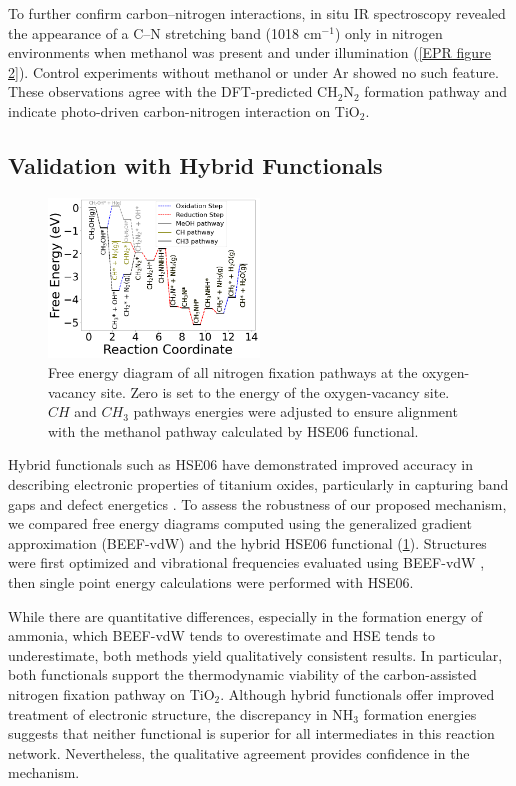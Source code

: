 To further confirm carbon–nitrogen interactions, in situ IR spectroscopy revealed the appearance of a C–N stretching band (1018 cm$^{-1}$) only in nitrogen environments when methanol was present and under illumination (\ref{EPR figure 2}). Control experiments without methanol or under Ar showed no such feature. These observations agree with the DFT-predicted CH$_2$N$_2$ formation pathway and indicate photo-driven carbon-nitrogen interaction on TiO$_2$.

\subsection{Validation with Hybrid Functionals}

\begin{figure}[h]
\centering
\includegraphics[width=0.5\textwidth]{figures/proposal_figures/HSE_full_fig.png}
\caption{Free energy diagram of all nitrogen fixation pathways at the oxygen-vacancy site. Zero is set to the energy of the oxygen-vacancy site. $CH$ and $CH_3$ pathways energies were adjusted to ensure alignment with the methanol pathway calculated by HSE06 functional.}
\label{fig:HSE_full_fig}
\end{figure}

Hybrid functionals such as HSE06 have demonstrated improved accuracy in describing electronic properties of titanium oxides, particularly in capturing band gaps and defect energetics \cite{hse}. To assess the robustness of our proposed mechanism, we compared free energy diagrams computed using the generalized gradient approximation (BEEF-vdW) and the hybrid HSE06 functional (\ref{fig:HSE_full_fig}). Structures were first optimized and vibrational frequencies evaluated using BEEF-vdW \cite{beef}, then single point energy calculations were performed with HSE06.

While there are quantitative differences, especially in the formation energy of ammonia, which BEEF-vdW tends to overestimate and HSE tends to underestimate, both methods yield qualitatively consistent results. In particular, both functionals support the thermodynamic viability of the carbon-assisted nitrogen fixation pathway on TiO$_2$. Although hybrid functionals offer improved treatment of electronic structure, the discrepancy in NH$_3$ formation energies suggests that neither functional is superior for all intermediates in this reaction network. Nevertheless, the qualitative agreement provides confidence in the mechanism.

